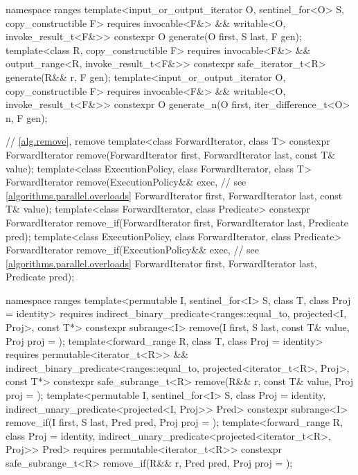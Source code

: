 \begin{codeblock}
{  namespace ranges {
    template<input_or_output_iterator O, sentinel_for<O> S, copy_constructible F>
      requires invocable<F&> && writable<O, invoke_result_t<F&>>
      constexpr O generate(O first, S last, F gen);
    template<class R, copy_constructible F>
      requires invocable<F&> && output_range<R, invoke_result_t<F&>>
      constexpr safe_iterator_t<R> generate(R&& r, F gen);
    template<input_or_output_iterator O, copy_constructible F>
      requires invocable<F&> && writable<O, invoke_result_t<F&>>
      constexpr O generate_n(O first, iter_difference_t<O> n, F gen);
  }

  // \ref{alg.remove}, remove
  template<class ForwardIterator, class T>
    constexpr ForwardIterator remove(ForwardIterator first, ForwardIterator last,
                                     const T& value);
  template<class ExecutionPolicy, class ForwardIterator, class T>
    ForwardIterator remove(ExecutionPolicy&& exec,              // see \ref{algorithms.parallel.overloads}
                           ForwardIterator first, ForwardIterator last,
                           const T& value);
  template<class ForwardIterator, class Predicate>
    constexpr ForwardIterator remove_if(ForwardIterator first, ForwardIterator last,
                                        Predicate pred);
  template<class ExecutionPolicy, class ForwardIterator, class Predicate>
    ForwardIterator remove_if(ExecutionPolicy&& exec,           // see \ref{algorithms.parallel.overloads}
                              ForwardIterator first, ForwardIterator last,
                              Predicate pred);

  namespace ranges {
    template<permutable I, sentinel_for<I> S, class T, class Proj = identity>
      requires indirect_binary_predicate<ranges::equal_to, projected<I, Proj>, const T*>
      constexpr subrange<I> remove(I first, S last, const T& value, Proj proj = {});
    template<forward_range R, class T, class Proj = identity>
      requires permutable<iterator_t<R>> &&
               indirect_binary_predicate<ranges::equal_to,
                                         projected<iterator_t<R>, Proj>, const T*>
      constexpr safe_subrange_t<R>
        remove(R&& r, const T& value, Proj proj = {});
    template<permutable I, sentinel_for<I> S, class Proj = identity,
             indirect_unary_predicate<projected<I, Proj>> Pred>
      constexpr subrange<I> remove_if(I first, S last, Pred pred, Proj proj = {});
    template<forward_range R, class Proj = identity,
             indirect_unary_predicate<projected<iterator_t<R>, Proj>> Pred>
      requires permutable<iterator_t<R>>
      constexpr safe_subrange_t<R>
        remove_if(R&& r, Pred pred, Proj proj = {});
  }

}
\end{codeblock}
